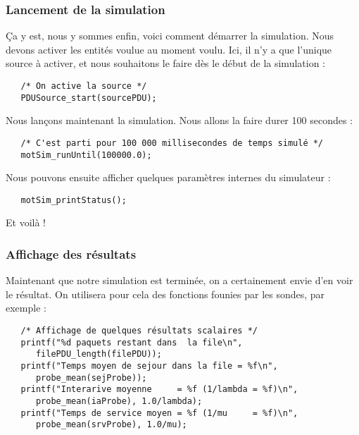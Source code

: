 %
\subsubsection{Lancement de la simulation}

   Ça y est, nous y sommes enfin, voici comment démarrer la
simulation. Nous devons activer les entités voulue au moment
voulu. Ici, il n'y a que l'unique source à activer, et nous souhaitons
le faire dès le début de la simulation :

\begin{verbatim}
   /* On active la source */
   PDUSource_start(sourcePDU);
\end{verbatim}

   Nous lançons maintenant la simulation. Nous allons la faire durer
100 secondes :

\begin{verbatim}
   /* C'est parti pour 100 000 millisecondes de temps simulé */
   motSim_runUntil(100000.0);
\end{verbatim}

   Nous pouvons ensuite afficher quelques paramètres internes du
simulateur :

\begin{verbatim}
   motSim_printStatus();
\end{verbatim}

   Et voilà !

%
\subsubsection{Affichage des résultats}

   Maintenant que notre simulation est terminée, on a certainement 
envie d'en voir le résultat. On utilisera pour cela des fonctions
founies par les sondes, par exemple :

\begin{verbatim}
   /* Affichage de quelques résultats scalaires */
   printf("%d paquets restant dans  la file\n",
	  filePDU_length(filePDU));
   printf("Temps moyen de sejour dans la file = %f\n",
	  probe_mean(sejProbe));
   printf("Interarive moyenne     = %f (1/lambda = %f)\n",
	  probe_mean(iaProbe), 1.0/lambda);
   printf("Temps de service moyen = %f (1/mu     = %f)\n",
	  probe_mean(srvProbe), 1.0/mu);
\end{verbatim}

